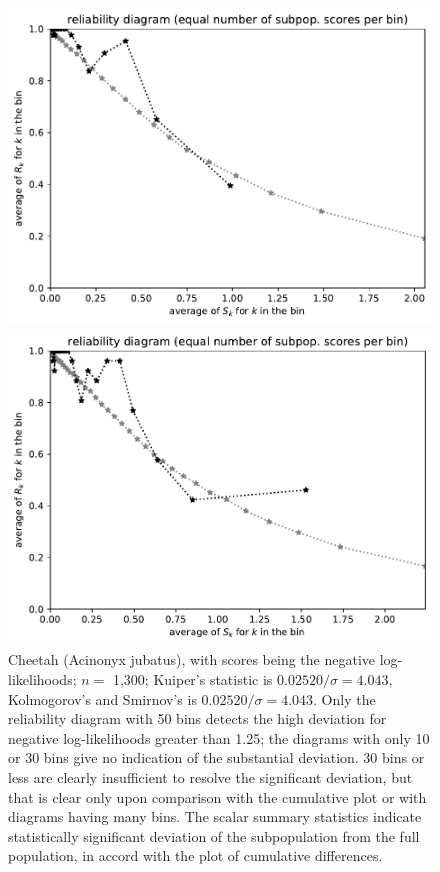 \documentclass{article}
\begin{document}
\begin{figure}
\begin{centering}
\parbox{\imsize}{\includegraphics[width=\imsize]
{./codes/unweighted/nll-1-293-cheetah-chetah-Acinonyx-jubatusequisamps30}}
\quad\quad
\parbox{\imsize}{\includegraphics[width=\imsize]
{./codes/unweighted/nll-1-293-cheetah-chetah-Acinonyx-jubatusequisamps50}}

\end{centering}
\caption{Cheetah (Acinonyx jubatus),
         with scores being the negative log-likelihoods;
         $n =$ 1,300; Kuiper's statistic is $0.02520 / \sigma = 4.043$,
         Kolmogorov's and Smirnov's is $0.02520 / \sigma = 4.043$.
Only the reliability diagram with 50 bins
detects the high deviation for negative log-likelihoods
greater than 1.25; the diagrams with only 10 or 30 bins give no indication
of the substantial deviation. 30 bins or less are clearly insufficient
to resolve the significant deviation, but that is clear only upon comparison
with the cumulative plot or with diagrams having many bins.
The scalar summary statistics indicate statistically significant deviation
of the subpopulation from the full population, in accord with the plot
of cumulative differences.
}
\label{cheetah-chetah-Acinonyx-jubatus-nll}
\end{figure}
\end{document}
